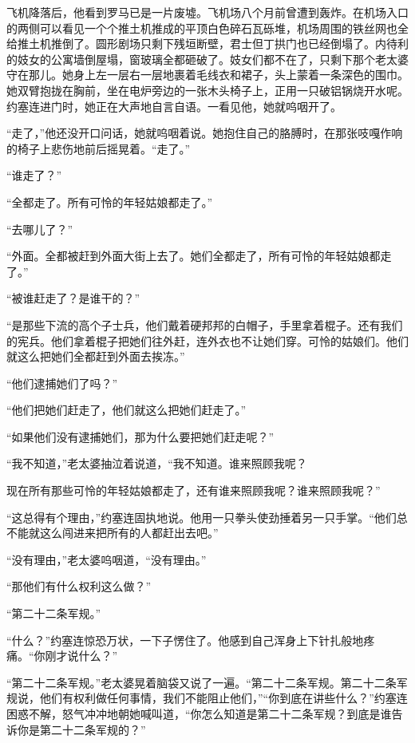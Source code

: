  


    飞机降落后，他看到罗马已是一片废墟。飞机场八个月前曾遭到轰炸。在机场入口的两侧可以看见一个个推土机推成的平顶白色碎石瓦砾堆，机场周围的铁丝网也全给推土机推倒了。圆形剧场只剩下残垣断壁，君士但丁拱门也已经倒塌了。内待利的妓女的公寓墙倒屋塌，窗玻璃全都砸破了。妓女们都不在了，只剩下那个老太婆守在那儿。她身上左一层右一层地裹着毛线衣和裙子，头上蒙着一条深色的围巾。她双臂抱拢在胸前，坐在电炉旁边的一张木头椅子上，正用一只破铝锅烧开水呢。约塞连进门时，她正在大声地自言自语。一看见他，她就呜咽开了。

    “走了，”他还没开口问话，她就呜咽着说。她抱住自己的胳膊时，在那张吱嘎作响的椅子上悲伤地前后摇晃着。“走了。”

    “谁走了？”

    “全都走了。所有可怜的年轻姑娘都走了。”

    “去哪儿了？”

    “外面。全都被赶到外面大街上去了。她们全都走了，所有可怜的年轻姑娘都走了。”

    “被谁赶走了？是谁干的？”

    “是那些下流的高个子士兵，他们戴着硬邦邦的白帽子，手里拿着棍子。还有我们的宪兵。他们拿着棍子把她们往外赶，连外衣也不让她们穿。可怜的姑娘们。他们就这么把她们全都赶到外面去挨冻。”

    “他们逮捕她们了吗？”

    “他们把她们赶走了，他们就这么把她们赶走了。”

    “如果他们没有逮捕她们，那为什么要把她们赶走呢？”

    “我不知道，”老太婆抽泣着说道，“我不知道。谁来照顾我呢？

    现在所有那些可怜的年轻姑娘都走了，还有谁来照顾我呢？谁来照顾我呢？”

    “这总得有个理由，”约塞连固执地说。他用一只拳头使劲捶着另一只手掌。“他们总不能就这么闯进来把所有的人都赶出去吧。”

    “没有理由，”老太婆呜咽道，“没有理由。”

    “那他们有什么权利这么做？”

    “第二十二条军规。”

    “什么？”约塞连惊恐万状，一下子愣住了。他感到自己浑身上下针扎般地疼痛。“你刚才说什么？”

    “第二十二条军规。”老太婆晃着脑袋又说了一遍。“第二十二条军规。第二十二条军规说，他们有权利做任何事情，我们不能阻止他们，”“你到底在讲些什么？”约塞连困惑不解，怒气冲冲地朝她喊叫道，“你怎么知道是第二十二条军规？到底是谁告诉你是第二十二条军规的？”

